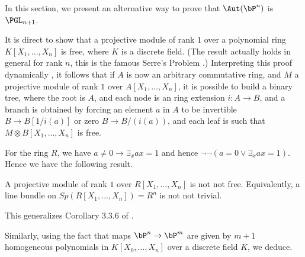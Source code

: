 In this section, we present an alternative way to prove that   $\Aut(\bP^n)$ is $\PGL_{n+1}$.

It is direct \cite{seminormal} to show that a projective module of rank $1$ over a polynomial
ring $K[X_1,\dots,X_n]$ is free, where $K$ is a discrete field. (The result actually holds in general
for rank $n$, this is the famous Serre's Problem \cite{Lam}.) Interpreting this proof dynamically
\cite{lombardi-quitte}, it follows that if $A$ is now an arbitrary commutative ring, and $M$ a
projective module of rank $1$ over $A[X_1,\dots,X_n]$, it is possible to build a binary tree, where
the root is $A$, and each node is an ring extension $i:A\rightarrow B$, and a branch is obtained
by forcing an element $a$ in $A$ to be invertible $B\rightarrow B[1/i(a)]$ or zero $B\rightarrow B/(i(a))$,
and each leaf is such that $M\otimes B[X_1,\dots,X_n]$ is free.

For the ring $R$, we have $a\neq 0\rightarrow \exists_x ax=1$ and hence $\neg \neg (a=0\vee \exists_x a x=1)$.
Hence we have the following result.

\begin{lemma}\label{notnot}
  A projective module of rank $1$ over $R[X_1,\dots,X_n]$ is not not free. Equivalently, 
a line bundle on $Sp(R[X_1,\dots,X_n]) = R^n$ is not not trivial.
\end{lemma}

This generalizes Corollary 3.3.6 of \cite{draft}.



Similarly, using the fact that maps $\bP^n\rightarrow \bP^m$ are given by $m+1$ homogeneous polynomials in $K[X_0,\dots,X_n]$
over a discrete field $K$, we deduce.

